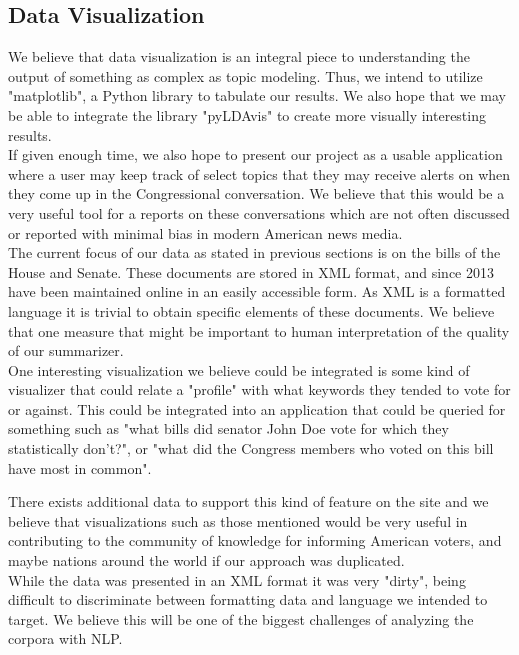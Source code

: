 \documentclass[11pt,a4paper]{article}
\begin{document}
 \subsection{Data Visualization}
  We believe that data visualization is an integral piece to understanding the output of something as complex as topic modeling. Thus, we intend to utilize "matplotlib", a Python library to tabulate our results. We also hope that we may be able to integrate the library "pyLDAvis" to create more visually interesting results.\\
  If given enough time, we also hope to present our project as a usable application where a user may keep track of select topics that they may receive alerts on when they come up in the Congressional conversation. We believe that this would be a very useful tool for a reports on these conversations which are not often discussed or reported with minimal bias in modern American news media.\\
  The current focus of our data as stated in previous sections is on the bills of the House and Senate. These documents are stored in XML format, and since 2013 have been maintained online in an easily accessible form. As XML is a formatted language it is trivial to obtain specific elements of these documents. We believe that one measure that might be important to human interpretation of the quality of our summarizer.\\
  
  One interesting visualization we believe could be integrated is some kind of visualizer that could relate a "profile" with what keywords they tended to vote for or against. This could be integrated into an application that could be queried for something such as "what bills did senator John Doe vote for which they statistically don't?", or "what did the Congress members who voted on this bill have most in common". 
  
  There exists additional data to support this kind of feature on the site and we believe that visualizations such as those mentioned would be very useful in contributing to the community of knowledge for informing American voters, and maybe nations around the world if our approach was duplicated.\\
  While the data was presented in an XML format it was very "dirty", being difficult to discriminate between formatting data and language we intended to target. We believe this will be one of the biggest challenges of analyzing the corpora with NLP. 
  
\end{document}
